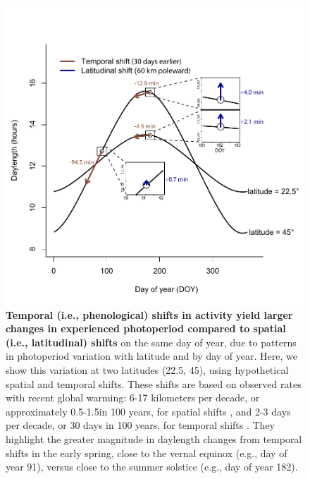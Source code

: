 \documentclass{article}
\begin{document}
\begin{figure}[h]
\centering
\includegraphics{..//..//analyses/photoperiod/figures/photo_spacetime_v2a.pdf} %
\caption{\textbf{Temporal (i.e., phenological) shifts in activity yield larger changes in experienced photoperiod compared to spatial (i.e., latitudinal) shifts} on the same day of year, due to patterns in photoperiod variation with latitude and by day of year. Here, we show this variation at two latitudes (22.5\degree, 45\degree), using hypothetical spatial and temporal shifts. These shifts are based on observed rates with recent global warming: 6-17 kilometers per decade, or approximately 0.5-1.5\degree in 100 years, for spatial shifts \citep{parmesan2003,parmesan2006}, and 2-3 days per decade, or 30 days in 100 years, for temporal shifts \citep{parmesan2006,chen2011}. They highlight the greater magnitude in daylength changes from temporal shifts in the early spring, close to the vernal equinox (e.g., day of year 91), versus close to the summer solstice (e.g., day of year 182).}
 \label{fig:spacetime}%
 \end{figure}
 
\end{document}
